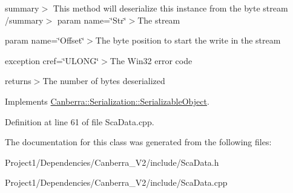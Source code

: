 summary$>$ This method will deserialize this instance from the byte stream /summary$>$ param name=\char`\"{}\+Str\char`\"{}$>$The stream

param name=\char`\"{}\+Offset\char`\"{}$>$The byte position to start the write in the stream

exception cref=\char`\"{}\+U\+L\+O\+N\+G\char`\"{}$>$The Win32 error code

returns$>$The number of bytes deserialized

Implements \hyperlink{class_canberra_1_1_serialization_1_1_serializable_object}{Canberra\+::\+Serialization\+::\+Serializable\+Object}.



Definition at line 61 of file Sca\+Data.\+cpp.



The documentation for this class was generated from the following files\+:\begin{DoxyCompactItemize}
\item 
Project1/\+Dependencies/\+Canberra\+\_\+\+V2/include/Sca\+Data.\+h\item 
Project1/\+Dependencies/\+Canberra\+\_\+\+V2/include/Sca\+Data.\+cpp\end{DoxyCompactItemize}
